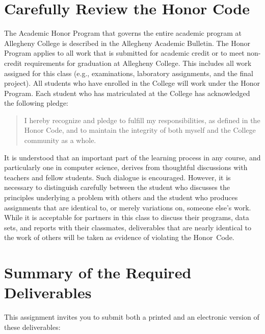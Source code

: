 \section*{Carefully Review the Honor Code}

The Academic Honor Program that governs the entire academic program at Allegheny College is described in the Allegheny
Academic Bulletin.  The Honor Program applies to all work that is submitted for academic credit or to meet non-credit
requirements for graduation at Allegheny College. This includes all work assigned for this class (e.g., examinations,
laboratory assignments, and the final project). All students who have enrolled in the College will work under the Honor
Program.  Each student who has matriculated at the College has acknowledged the following pledge:

\vspace*{-.1in}
\begin{quote}
  I hereby recognize and pledge to fulfill my responsibilities, as defined in the Honor Code, and to maintain the
  integrity of both myself and the College community as a whole.
\end{quote}
\vspace*{-.1in}

\noindent It is understood that an important part of the learning process in any course, and particularly one in
computer science, derives from thoughtful discussions with teachers and fellow students.  Such dialogue is encouraged.
However, it is necessary to distinguish carefully between the student who discusses the principles underlying a problem
with others and the student who produces assignments that are identical to, or merely variations on, someone else's
work. While it is acceptable for partners in this class to discuss their programs, data sets, and reports with their
classmates, deliverables that are nearly identical to the work of others will be taken as evidence of violating the
\mbox{Honor Code}.

\section*{Summary of the Required Deliverables}

This assignment invites you to submit both a printed and an electronic version of these deliverables:

